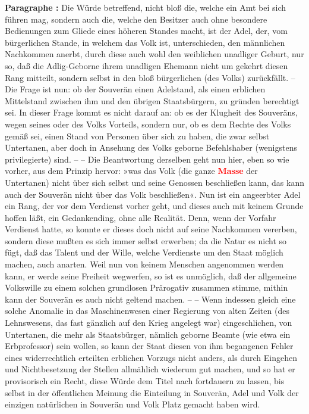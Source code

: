 \documentclass[a4paper,12pt,twoside]{book}
\newcommand{\match}[1]{\textcolor{red}{\textbf{#1}}}
\begin{document}
	\textbf{Paragraphe : }Die Würde betreffend, nicht bloß die, welche ein Amt bei sich führen mag, sondern auch die, welche den Besitzer auch ohne besondere Bedienungen zum Gliede eines höheren Standes macht, ist der Adel, der, vom bürgerlichen Stande, in welchem das Volk ist, unterschieden, den männlichen  Nachkommen anerbt, durch diese auch wohl den weiblichen unadliger Geburt, nur so, daß die Adlig-Geborne ihrem unadligen Ehemann nicht um gekehrt diesen Rang mitteilt, sondern selbst in den bloß bürgerlichen (des Volks) zurückfällt. – Die Frage ist nun: ob der Souverän einen Adelstand, als einen erblichen Mittelstand zwischen ihm und den übrigen Staatsbürgern, zu gründen berechtigt sei. In dieser Frage kommt es nicht darauf an: ob es der Klugheit des Souveräns, wegen seines oder des Volks Vorteils, sondern nur, ob es dem Rechte des Volks gemäß sei, einen Stand von Personen über sich zu haben, die zwar selbst Untertanen, aber doch in Ansehung des Volks geborne Befehlshaber (wenigstens privilegierte) sind. – – Die Beantwortung derselben geht nun hier, eben so wie vorher, aus dem Prinzip hervor: »was das Volk (die ganze \match{Masse} der Untertanen) nicht über sich selbst und seine Genossen beschließen kann, das kann auch der Souverän nicht über das Volk beschließen«. Nun ist ein angeerbter Adel ein Rang, der vor dem Verdienst vorher geht, und dieses auch mit keinem Grunde hoffen läßt, ein Gedankending, ohne alle Realität. Denn, wenn der Vorfahr Verdienst hatte, so konnte er dieses doch nicht auf seine Nachkommen vererben, sondern diese mußten es sich immer selbst erwerben; da die Natur es nicht so fügt, daß das Talent und der Wille, welche Verdienste um den Staat möglich machen, auch anarten. Weil nun von keinem Menschen angenommen werden kann, er werde seine Freiheit wegwerfen, so ist es unmöglich, daß der allgemeine Volkswille zu einem solchen grundlosen Prärogativ zusammen stimme, mithin kann der Souverän es auch nicht geltend machen. – – Wenn indessen gleich eine solche Anomalie in das Maschinenwesen einer Regierung von alten Zeiten (des Lehnswesens, das fast gänzlich auf den Krieg angelegt war) eingeschlichen, von Untertanen, die mehr als Staatsbürger, nämlich geborne Beamte (wie etwa ein Erbprofessor) sein wollen, so kann der Staat diesen von ihm begangenen Fehler eines widerrechtlich erteilten erblichen Vorzugs nicht anders, als durch Eingehen und Nichtbesetzung der Stellen allmählich wiederum gut machen, und  so hat er provisorisch ein Recht, diese Würde dem Titel nach fortdauern zu lassen, bis selbst in der öffentlichen Meinung die Einteilung in Souverän, Adel und Volk der einzigen natürlichen in Souverän und Volk Platz gemacht haben wird. 
	
\end{document}
